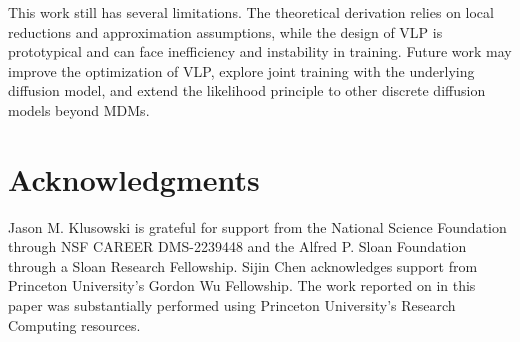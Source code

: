 \documentclass{article}
\theoremstyle{plain}
\theoremstyle{definition}
\theoremstyle{remark}
\begin{document}
This work still has several limitations. The theoretical derivation relies on local reductions and approximation assumptions, while the design of VLP is prototypical and can face inefficiency and instability in training. Future work may improve the optimization of VLP, explore joint training with the underlying diffusion model, and extend the likelihood principle to other discrete diffusion models beyond MDMs.

\section*{Acknowledgments}

Jason M. Klusowski is grateful for support from the National Science
Foundation through NSF CAREER DMS-2239448 and the Alfred P. Sloan Foundation through a Sloan
Research Fellowship. Sijin Chen acknowledges support from Princeton University's Gordon Wu Fellowship. The work reported on in this paper was substantially performed using Princeton University’s Research Computing resources. 




\newpage

{\small


}

% 

\newpage
\appendix

\end{document}
